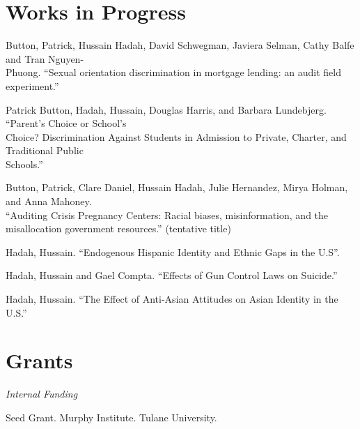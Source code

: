 \documentclass[letterpaper]{article}
\renewenvironment{itemize}{
  \begin{list}{}{
    \setlength{\leftmargin}{1.5em}
  }
}{
  \end{list}
}
\begin{document}
\section*{Works in Progress}
\vspace{2 mm}
\begin{itemize}
\item Button, Patrick, Hussain Hadah, David Schwegman, Javiera Selman, Cathy Balfe and Tran Nguyen-\\{\makebox[4mm]{\hfill}}Phuong. ``Sexual orientation discrimination in mortgage lending: an audit field experiment.''

\item Patrick Button, Hadah, Hussain, Douglas Harris, and Barbara Lundebjerg. ``Parent’s Choice or School’s \\{\makebox[4mm]{\hfill}} Choice?
Discrimination Against Students in Admission to Private, Charter, and Traditional Public \\{\makebox[4mm]{\hfill}} Schools.''

\item Button, Patrick, Clare Daniel, Hussain Hadah, 
Julie Hernandez, Mirya Holman, and Anna Mahoney. 
\\{\makebox[4mm]{\hfill}}``Auditing Crisis
 Pregnancy Centers: Racial biases, misinformation, 
and the\\{\makebox[4mm]{\hfill}} misallocation government resources.'' (tentative title)

\item Hadah, Hussain. ``Endogenous Hispanic Identity and Ethnic Gaps in the U.S''.
\item Hadah, Hussain and Gael Compta. ``Effects of Gun Control Laws on Suicide.''
\item Hadah, Hussain. ``The Effect of Anti-Asian Attitudes on Asian Identity in the U.S.''
\end{itemize}


\section*{Grants}
\vspace{2 mm}
\textit{Internal Funding
}\begin{itemize}
  \item {}Seed Grant. Murphy Institute. Tulane University.
\end{itemize}
\vspace{2 mm}
\end{document}
